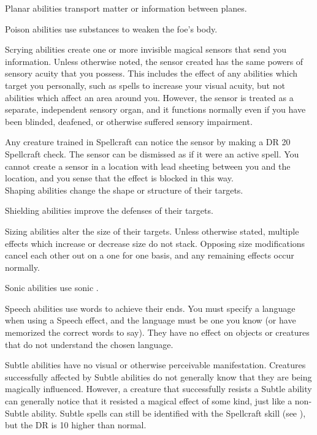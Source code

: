          Planar abilities transport matter or information between planes.

         Poison abilities use substances to weaken the foe's body.

         Scrying abilities create one or more invisible magical sensors that send you information.
        Unless otherwise noted, the sensor created has the same powers of sensory acuity that you possess.
        This includes the effect of any abilities which target you personally, such as spells to increase your visual acuity, but not abilities which affect an area around you.
        However, the sensor is treated as a separate, independent sensory organ, and it functions normally even if you have been blinded, deafened, or otherwise suffered sensory impairment.
        \par Any creature trained in Spellcraft can notice the sensor by making a DR 20 Spellcraft check.
        The sensor can be dismissed as if it were an active spell.
        You cannot create a sensor in a location with lead sheeting between you and the location, and you sense that the effect is blocked in this way.
        \\

         Shaping abilities change the shape or structure of their targets.

         Shielding abilities improve the defenses of their targets.

         Sizing abilities alter the size of their targets.
        Unless otherwise stated, multiple effects which increase or decrease size do not stack.
        Opposing size modifications cancel each other out on a one for one basis, and any remaining effects occur normally.

         Sonic abilities use sonic .

         Speech abilities use words to achieve their ends.
        You must specify a language when using a Speech effect, and the language must be one you know (or have memorized the correct words to say). They have no effect on objects or creatures that do not understand the chosen language.

         Subtle abilities have no visual or otherwise perceivable manifestation.
        Creatures successfully affected by Subtle abilities do not generally know that they are being magically influenced.
        However, a creature that successfully resists a Subtle ability can generally notice that it resisted a magical effect of some kind, just like a non-Subtle ability.
        Subtle spells can still be identified with the Spellcraft skill (see ), but the DR is 10 higher than normal.

